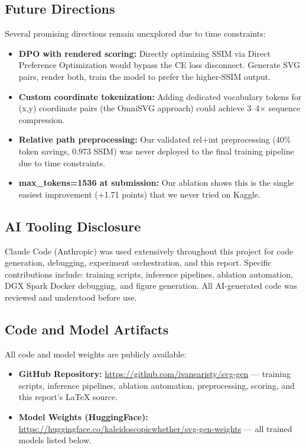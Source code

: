 \documentclass[11pt]{article}
\begin{document}
\subsection{Future Directions}

Several promising directions remain unexplored due to time constraints:

\begin{itemize}
    \item \textbf{DPO with rendered scoring:} Directly optimizing SSIM via Direct Preference Optimization would bypass the CE loss disconnect. Generate SVG pairs, render both, train the model to prefer the higher-SSIM output.
    \item \textbf{Custom coordinate tokenization:} Adding dedicated vocabulary tokens for (x,y) coordinate pairs (the OmniSVG approach) could achieve 3--4$\times$ sequence compression.
    \item \textbf{Relative path preprocessing:} Our validated rel+int preprocessing (40\% token savings, 0.973 SSIM) was never deployed to the final training pipeline due to time constraints.
    \item \textbf{max\_tokens=1536 at submission:} Our ablation shows this is the single easiest improvement (+1.71 points) that we never tried on Kaggle.
\end{itemize}

\subsection{AI Tooling Disclosure}

Claude Code (Anthropic) was used extensively throughout this project for code generation, debugging, experiment orchestration, and this report. Specific contributions include: training scripts, inference pipelines, ablation automation, DGX Spark Docker debugging, and figure generation. All AI-generated code was reviewed and understood before use.

\subsection{Code and Model Artifacts}

All code and model weights are publicly available:

\begin{itemize}
    \item \textbf{GitHub Repository:} \url{https://github.com/ivanearisty/svg-gen} --- training scripts, inference pipelines, ablation automation, preprocessing, scoring, and this report's \LaTeX{} source.
    \item \textbf{Model Weights (HuggingFace):} \url{https://huggingface.co/kaleidoscopicwhether/svg-gen-weights} --- all trained models listed below.
\end{itemize}
\end{document}
